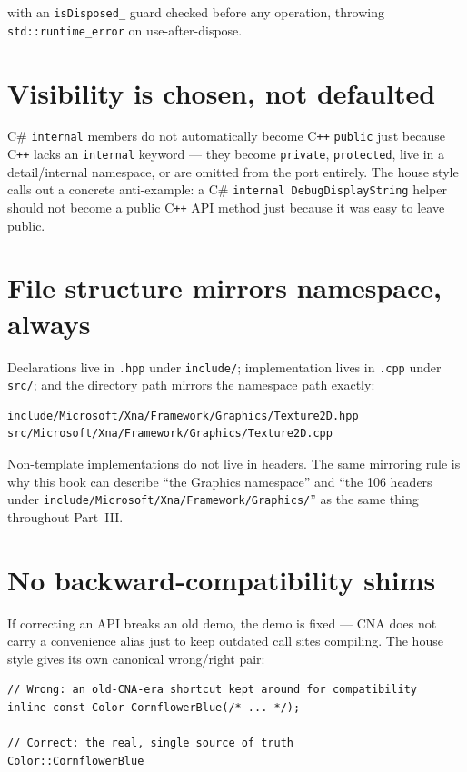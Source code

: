 with an \texttt{isDisposed\_} guard checked before any operation, throwing
\texttt{std::runtime\_error} on use-after-dispose.

\section{Visibility is chosen, not defaulted}

C\# \texttt{internal} members do not automatically become C\texttt{++} \texttt{public} just
because C\texttt{++} lacks an \texttt{internal} keyword --- they become \texttt{private},
\texttt{protected}, live in a detail/internal namespace, or are omitted from the port
entirely. The house style calls out a concrete anti-example: a C\# \texttt{internal
DebugDisplayString} helper should not become a public C\texttt{++} API method just because it
was easy to leave public.

\section{File structure mirrors namespace, always}

Declarations live in \texttt{.hpp} under \texttt{include/}; implementation lives in
\texttt{.cpp} under \texttt{src/}; and the directory path mirrors the namespace path exactly:

\begin{lstlisting}
include/Microsoft/Xna/Framework/Graphics/Texture2D.hpp
src/Microsoft/Xna/Framework/Graphics/Texture2D.cpp
\end{lstlisting}

Non-template implementations do not live in headers. The same mirroring rule is why this
book can describe ``the Graphics namespace'' and ``the 106 headers under
\texttt{include/Microsoft/Xna/Framework/Graphics/}'' as the same thing throughout Part~III.

\section{No backward-compatibility shims}

If correcting an API breaks an old demo, the demo is fixed --- CNA does not carry a
convenience alias just to keep outdated call sites compiling. The house style gives its own
canonical wrong/right pair:

\begin{lstlisting}
// Wrong: an old-CNA-era shortcut kept around for compatibility
inline const Color CornflowerBlue(/* ... */);

// Correct: the real, single source of truth
Color::CornflowerBlue
\end{lstlisting}

